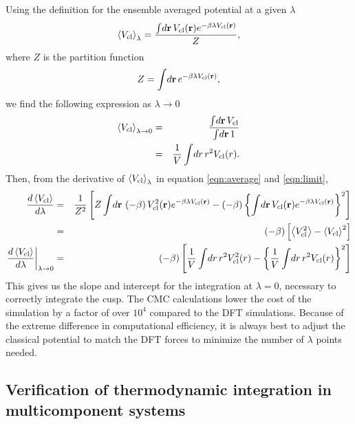Using the definition for the ensemble averaged potential at a given
$\lambda$
\begin{eqnarray}
  \left< V_{\rm cl} \right>_{\lambda} = \frac{ \int \! d{\bf r} \, V_{\rm cl}({\bf r}) 
  e^{ -\beta \lambda V_{\rm cl}({\bf r}) } }
  { Z}, \label{eqn:average}
\end{eqnarray}
where $Z$ is the partition function
\begin{eqnarray}
Z =  \int \! d{\bf r} \, e^{ -\beta \lambda V_{\rm cl}({\bf r}) },
\end{eqnarray}
%
we find the following expression as $\lambda \to 0$
%
\begin{eqnarray}
 \left< V_{\rm cl} \right>_{\lambda \to 0} &=& \frac{ \int \! d{\bf r} \, V_{\rm
 cl}}
 {  \int \! d{\bf r} \, 1} \nonumber \\
 &=& \frac{1}{V}  \int \! dr \, r^2 V_{\rm cl}(r). \label{eqn:limit}
\end{eqnarray}
%
Then, from the derivative of $\left< V_{\rm cl} \right>_{\lambda}$ in
equation \ref{eqn:average} and \ref{eqn:limit},
\begin{eqnarray}
  \frac{d \left< V_{\rm cl} \right>}{d \lambda}
   &=& \frac{1}{Z^2} 
  \left[ Z \int \! d{\bf r} \, \left(-\beta \right)V_{\rm cl}^2({\bf r}) 
    e^{ -\beta \lambda V_{\rm cl}({\bf r}) } 
   - \left(-\beta \right)\left\{  \int \! d{\bf r} \, V_{\rm cl}({\bf r}) e^{ -\beta \lambda
     V_{\rm cl}({\bf r}) } \right\}^2
    \right] \nonumber \\
   &=& (-\beta) \left[ \left< V_{\rm cl}^2 \right> - \left< V_{\rm
   cl}\right>^2 \right] \nonumber \\
   \left. \frac{d \left< V_{\rm cl} \right>}{d \lambda}\right|_{\lambda \to 0} 
   &=& (-\beta) \left[  \frac{1}{V}  \int \! dr \, r^2 V^2_{\rm cl}(r) -
     \left\{ \frac{1}{V}  \int \! dr \, r^2 V_{\rm cl}(r) \right\}^2 \right]
  \end{eqnarray}
This gives us the slope and intercept for the integration at $\lambda=0$, necessary to
correctly integrate the cusp. The CMC calculations lower the cost of the simulation
by a factor of over $10^4$ compared to the DFT simulations. Because of the extreme
difference in computational efficiency, it is always best to adjust the classical
potential to match the DFT forces to minimize the number of $\lambda$ points needed.


\subsection{Verification of thermodynamic integration in multicomponent systems}

